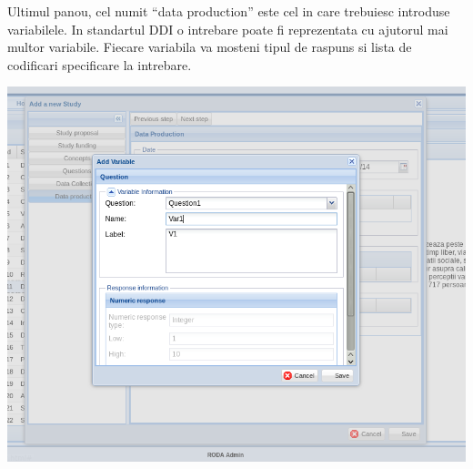 Ultimul panou, cel numit “data production” este cel in care trebuiesc introduse variabilele. In standartul DDI o intrebare poate fi reprezentata cu ajutorul mai multor variabile. Fiecare variabila va mosteni tipul de raspuns si lista de codificari specificare la intrebare. 

\includegraphics[width=16cm]{img/ddi-editor-addvariable}
